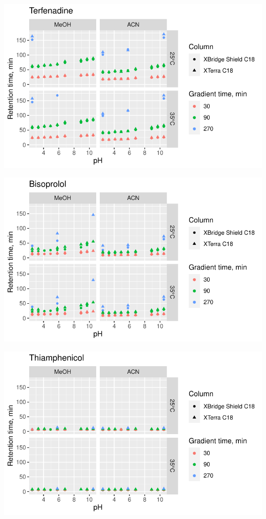 \documentclass[
  letterpaper,
  DIV=11,
  numbers=noendperiod]{scrreprt}
\begin{document}
\includegraphics{index_files/figure-pdf/unnamed-chunk-4-123.pdf}

\includegraphics{index_files/figure-pdf/unnamed-chunk-4-124.pdf}

\includegraphics{index_files/figure-pdf/unnamed-chunk-4-125.pdf}
\end{document}

